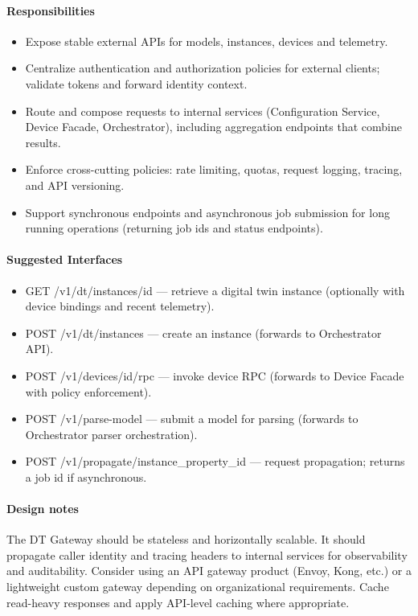 \documentclass[11pt,a4paper]{article}
\begin{document}
\paragraph{Responsibilities}
\begin{itemize}
  \item Expose stable external APIs for models, instances, devices and telemetry.
  \item Centralize authentication and authorization policies for external clients; validate tokens and forward identity context.
  \item Route and compose requests to internal services (Configuration Service, Device Facade, Orchestrator), including aggregation endpoints that combine results.
  \item Enforce cross-cutting policies: rate limiting, quotas, request logging, tracing, and API versioning.
  \item Support synchronous endpoints and asynchronous job submission for long running operations (returning job ids and status endpoints).
\end{itemize}

\paragraph{Suggested Interfaces}
\begin{itemize}
  \item GET /v1/dt/instances/{id} --- retrieve a digital twin instance (optionally with device bindings and recent telemetry).
  \item POST /v1/dt/instances --- create an instance (forwards to Orchestrator API).
  \item POST /v1/devices/{id}/rpc --- invoke device RPC (forwards to Device Facade with policy enforcement).
  \item POST /v1/parse-model --- submit a model for parsing (forwards to Orchestrator parser orchestration).
  \item POST /v1/propagate/{instance_property_id} --- request propagation; returns a job id if asynchronous.
\end{itemize}

\paragraph{Design notes}
The DT Gateway should be stateless and horizontally scalable. It should propagate caller identity and tracing headers to internal services for observability and auditability. Consider using an API gateway product (Envoy, Kong, etc.) or a lightweight custom gateway depending on organizational requirements. Cache read-heavy responses and apply API-level caching where appropriate.
\end{document}
